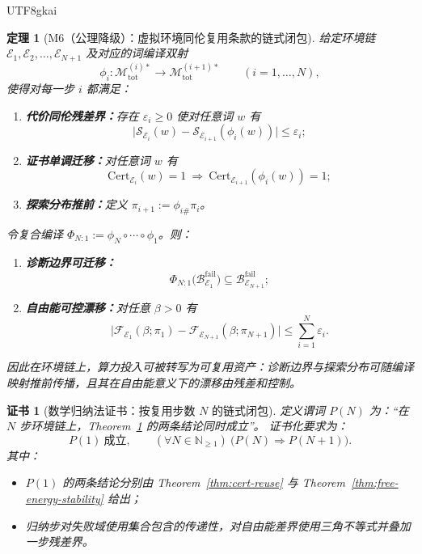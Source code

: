 \documentclass[12pt]{article}
\newtheorem{theorem}{定理}[section]
\newtheorem{certificate}{证书}[section]
\begin{document}
\begin{CJK*}{UTF8}{gkai}
\begin{theorem}[M6（公理降级）：虚拟环境同伦复用条款的链式闭包]
\label{thm:m6-homotopy-reuse-chain}
给定环境链 $\mathcal{E}_1,\mathcal{E}_2,\ldots,\mathcal{E}_{N+1}$ 及对应的词编译双射
\[
\phi_i:\mathcal{M}_{\mathrm{tot}}^{(i)\ast}\to \mathcal{M}_{\mathrm{tot}}^{(i+1)\ast}\qquad (i=1,\ldots,N),
\]
使得对每一步 $i$ 都满足：
\begin{enumerate}
  \item \textbf{代价同伦残差界：}存在 $\varepsilon_i\ge 0$ 使对任意词 $w$ 有
  \[
  \bigl|\mathcal{S}_{\mathcal{E}_i}(w)-\mathcal{S}_{\mathcal{E}_{i+1}}(\phi_i(w))\bigr|\le \varepsilon_i;
  \]
  \item \textbf{证书单调迁移：}对任意词 $w$ 有
  \[
  \mathrm{Cert}_{\mathcal{E}_i}(w)=1\ \Longrightarrow\ \mathrm{Cert}_{\mathcal{E}_{i+1}}(\phi_i(w))=1;
  \]
  \item \textbf{探索分布推前：}定义 $\pi_{i+1}:=\phi_{i\#}\pi_i$。
\end{enumerate}
令复合编译 $\Phi_{N:1}:=\phi_N\circ\cdots\circ\phi_1$。则：
\begin{enumerate}
  \item \textbf{诊断边界可迁移：}
  \[
  \Phi_{N:1}\bigl(\mathcal{B}^{\mathrm{fail}}_{\mathcal{E}_1}\bigr)\subseteq \mathcal{B}^{\mathrm{fail}}_{\mathcal{E}
    _{N+1}};
  \]
  \item \textbf{自由能可控漂移：}对任意 $\beta>0$ 有
  \[
  \bigl|\mathcal{F}_{\mathcal{E}_1}(\beta;\pi_1)-\mathcal{F}_{\mathcal{E}_{N+1}}(\beta;\pi_{N+1})\bigr|
  \le
  \sum_{i=1}^{N}\varepsilon_i.
  \]
\end{enumerate}
因此在环境链上，算力投入可被转写为可复用资产：诊断边界与探索分布可随编译映射推前传播，且其在自由能意义下的漂移由残差和控制。
\end{theorem}

\begin{certificate}[数学归纳法证书：按复用步数 $N$ 的链式闭包]
\label{cert:m6-homotopy-reuse-induction}
定义谓词 $P(N)$ 为：“在 $N$ 步环境链上，Theorem~\ref{thm:m6-homotopy-reuse-chain} 的两条结论同时成立”。
证书化要求为：
\[
P(1)\ \text{成立},\qquad
(\forall N\in\mathbb{N}_{\ge 1})\ \bigl(P(N)\Rightarrow P(N+1)\bigr).
\]
其中：
\begin{itemize}
  \item $P(1)$ 的两条结论分别由 Theorem~\ref{thm:cert-reuse} 与 Theorem~\ref{thm:free-energy-stability} 给出；
  \item 归纳步对失败域使用集合包含的传递性，对自由能差界使用三角不等式并叠加一步残差界。
\end{itemize}
\end{certificate}


\end{CJK*}
\end{document}
